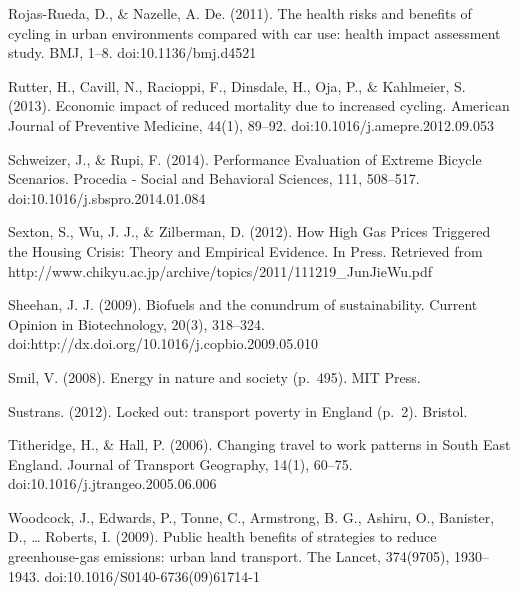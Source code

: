 Rojas-Rueda, D., \& Nazelle, A. De. (2011). The health risks and
benefits of cycling in urban environments compared with car use: health
impact assessment study. BMJ, 1--8. doi:10.1136/bmj.d4521

Rutter, H., Cavill, N., Racioppi, F., Dinsdale, H., Oja, P., \&
Kahlmeier, S. (2013). Economic impact of reduced mortality due to
increased cycling. American Journal of Preventive Medicine, 44(1),
89--92. doi:10.1016/j.amepre.2012.09.053

Schweizer, J., \& Rupi, F. (2014). Performance Evaluation of Extreme
Bicycle Scenarios. Procedia - Social and Behavioral Sciences, 111,
508--517. doi:10.1016/j.sbspro.2014.01.084

Sexton, S., Wu, J. J., \& Zilberman, D. (2012). How High Gas Prices
Triggered the Housing Crisis: Theory and Empirical Evidence. In Press.
Retrieved from
http://www.chikyu.ac.jp/archive/topics/2011/111219\_JunJieWu.pdf

Sheehan, J. J. (2009). Biofuels and the conundrum of sustainability.
Current Opinion in Biotechnology, 20(3), 318--324.
doi:http://dx.doi.org/10.1016/j.copbio.2009.05.010

Smil, V. (2008). Energy in nature and society (p.~495). MIT Press.

Sustrans. (2012). Locked out: transport poverty in England (p.~2).
Bristol.

Titheridge, H., \& Hall, P. (2006). Changing travel to work patterns in
South East England. Journal of Transport Geography, 14(1), 60--75.
doi:10.1016/j.jtrangeo.2005.06.006

Woodcock, J., Edwards, P., Tonne, C., Armstrong, B. G., Ashiru, O.,
Banister, D., \ldots{} Roberts, I. (2009). Public health benefits of
strategies to reduce greenhouse-gas emissions: urban land transport. The
Lancet, 374(9705), 1930--1943. doi:10.1016/S0140-6736(09)61714-1
